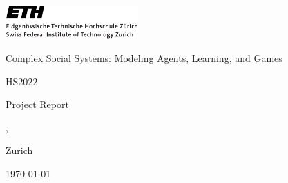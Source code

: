 \includegraphics[width=2in]{ETHlogo.pdf}


\begin{center}

\Large {Complex Social Systems: Modeling Agents, Learning, and Games}

HS2022


\normalsize Project Report


\textbf{\huge{\projtitle}}


\Large{ \nameA, \nameB}


\large{
Zurich

\today}

\normalsize

\end{center}
\thispagestyle{empty}

\newpage